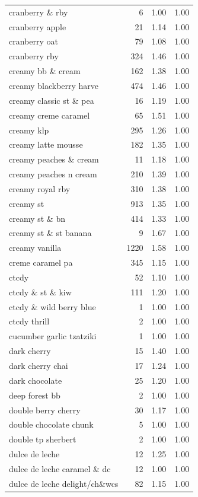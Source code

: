 \begin{table}
\begin{tabular}{lrrr}
cranberry \& rby & 6 & 1.00 & 1.00 \\
cranberry apple & 21 & 1.14 & 1.00 \\
cranberry oat & 79 & 1.08 & 1.00 \\
cranberry rby & 324 & 1.46 & 1.00 \\
creamy bb \& cream & 162 & 1.38 & 1.00 \\
creamy blackberry harve & 474 & 1.46 & 1.00 \\
creamy classic st \& pea & 16 & 1.19 & 1.00 \\
creamy creme caramel & 65 & 1.51 & 1.00 \\
creamy klp & 295 & 1.26 & 1.00 \\
creamy latte mousse & 182 & 1.35 & 1.00 \\
creamy peaches \& cream & 11 & 1.18 & 1.00 \\
creamy peaches n cream & 210 & 1.39 & 1.00 \\
creamy royal rby & 310 & 1.38 & 1.00 \\
creamy st & 913 & 1.35 & 1.00 \\
creamy st \& bn & 414 & 1.33 & 1.00 \\
creamy st \& st banana & 9 & 1.67 & 1.00 \\
creamy vanilla & 1220 & 1.58 & 1.00 \\
creme caramel pa & 345 & 1.15 & 1.00 \\
ctcdy & 52 & 1.10 & 1.00 \\
ctcdy \& st \& kiw & 111 & 1.20 & 1.00 \\
ctcdy \& wild berry blue & 1 & 1.00 & 1.00 \\
ctcdy thrill & 2 & 1.00 & 1.00 \\
cucumber garlic tzatziki & 1 & 1.00 & 1.00 \\
dark cherry & 15 & 1.40 & 1.00 \\
dark cherry chai & 17 & 1.24 & 1.00 \\
dark chocolate & 25 & 1.20 & 1.00 \\
deep forest bb & 2 & 1.00 & 1.00 \\
double berry cherry & 30 & 1.17 & 1.00 \\
double chocolate chunk & 5 & 1.00 & 1.00 \\
double tp sherbert & 2 & 1.00 & 1.00 \\
dulce de leche & 12 & 1.25 & 1.00 \\
dulce de leche caramel \& dc & 12 & 1.00 & 1.00 \\
dulce de leche delight/ch\&wcs & 82 & 1.15 & 1.00 \\

\end{tabular}
\end{table}
